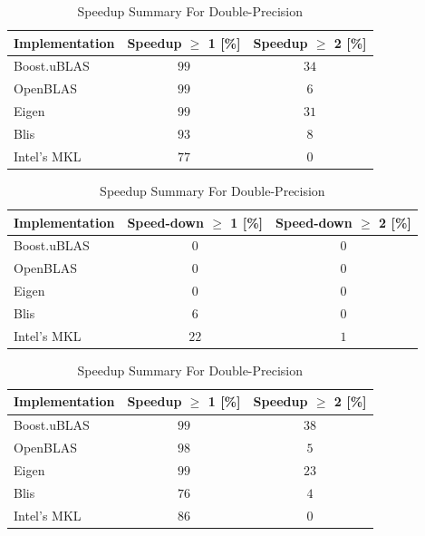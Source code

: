 \begin{table}[ht]
    \centering
    \caption{Speedup Summary For Single-Precision}
    \begin{tabular}{|l|c|c|}
        \hline
        \textbf{Implementation} & \textbf{Speedup $\geq$ 1 [\%]} & \textbf{Speedup $\geq$ 2 [\%]}\\
        \hline
        Boost.uBLAS & $99$ & $34$ \\
        \hline
        OpenBLAS    & $99$ & $6$ \\
        \hline
        Eigen       & $99$ & $31$ \\
        \hline
        Blis        & $93$ & $8$ \\
        \hline
        Intel's MKL & $77$ & $0$ \\
        \hline
    \end{tabular}
    
    \begin{tabular}{|l|c|c|}
        \hline
        \textbf{Implementation} & \textbf{Speed-down $\geq$ 1 [\%]} & \textbf{Speed-down $\geq$ 2 [\%]}\\
        \hline
        Boost.uBLAS & $0$ & $0$ \\
        \hline
        OpenBLAS    & $0$ & $0$ \\
        \hline
        Eigen       & $0$ & $0$ \\
        \hline
        Blis        & $6$ & $0$ \\
        \hline
        Intel's MKL & $22$ & $1$ \\
        \hline
    \end{tabular}
    
    \vspace*{1 cm}

    \centering
    \caption{Speedup Summary For Double-Precision}
    \begin{tabular}{|l|c|c|}
        \hline
        \textbf{Implementation} & \textbf{Speedup $\geq$ 1 [\%]} & \textbf{Speedup $\geq$ 2 [\%]}\\
        \hline
        Boost.uBLAS & $99$ & $38$ \\
        \hline
        OpenBLAS    & $98$ & $5$ \\
        \hline
        Eigen       & $99$ & $23$ \\
        \hline
        Blis        & $76$ & $4$ \\
        \hline
        Intel's MKL & $86$ & $0$ \\
        \hline
    \end{tabular}
    

\end{table}
